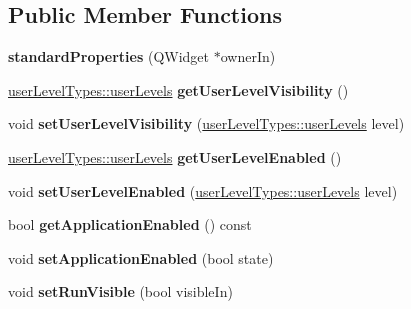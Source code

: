 \subsection*{Public Member Functions}
\begin{DoxyCompactItemize}
\item 
\hypertarget{classstandardProperties_ab4fbaf0e2349888165e11979d673dece}{
{\bfseries standardProperties} (QWidget $\ast$ownerIn)}
\label{classstandardProperties_ab4fbaf0e2349888165e11979d673dece}

\item 
\hypertarget{classstandardProperties_a6f29856bcc54de6eed3bfaf2dea2d240}{
\hyperlink{classuserLevelTypes_a033cf2a40f620286b1839dd360c8497b}{userLevelTypes::userLevels} {\bfseries getUserLevelVisibility} ()}
\label{classstandardProperties_a6f29856bcc54de6eed3bfaf2dea2d240}

\item 
\hypertarget{classstandardProperties_a2e0df80152d803022a35b217507cb3b6}{
void {\bfseries setUserLevelVisibility} (\hyperlink{classuserLevelTypes_a033cf2a40f620286b1839dd360c8497b}{userLevelTypes::userLevels} level)}
\label{classstandardProperties_a2e0df80152d803022a35b217507cb3b6}

\item 
\hypertarget{classstandardProperties_ad75704c9f1794eecee3a37f22b37a249}{
\hyperlink{classuserLevelTypes_a033cf2a40f620286b1839dd360c8497b}{userLevelTypes::userLevels} {\bfseries getUserLevelEnabled} ()}
\label{classstandardProperties_ad75704c9f1794eecee3a37f22b37a249}

\item 
\hypertarget{classstandardProperties_a0e6384bc3ae990267fa0798d48139c49}{
void {\bfseries setUserLevelEnabled} (\hyperlink{classuserLevelTypes_a033cf2a40f620286b1839dd360c8497b}{userLevelTypes::userLevels} level)}
\label{classstandardProperties_a0e6384bc3ae990267fa0798d48139c49}

\item 
\hypertarget{classstandardProperties_a3a9544fc66c78c603c730079dec24878}{
bool {\bfseries getApplicationEnabled} () const }
\label{classstandardProperties_a3a9544fc66c78c603c730079dec24878}

\item 
\hypertarget{classstandardProperties_a593a2653036c2d785667bca8d512480d}{
void {\bfseries setApplicationEnabled} (bool state)}
\label{classstandardProperties_a593a2653036c2d785667bca8d512480d}

\item 
\hypertarget{classstandardProperties_a79e20ba7d3905cad79aa9c716a276fac}{
void {\bfseries setRunVisible} (bool visibleIn)}
\label{classstandardProperties_a79e20ba7d3905cad79aa9c716a276fac}


\end{DoxyCompactItemize}
